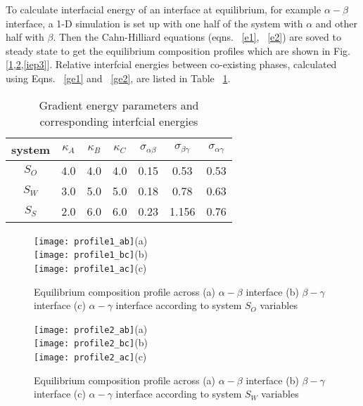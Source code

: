 \documentclass[12pt]{iiscthes}
\theoremstyle{definition}
\theoremstyle{definition}
\theoremstyle{remark}
\begin{document}
To calculate interfacial energy of an interface at equilibrium, for example $\alpha - \beta$ interface, a 1-D simulation is set up with one half of the system with $\alpha$ and other half with $\beta$. Then the Cahn-Hilliard equations (eqns. ~\ref{e1}, ~\ref{e2}) are soved to steady state to get the equilibrium composition profiles which are shown in Fig. [\ref{iep1},\ref{iep2},\ref{iep3}]. Relative interfcial energies between co-existing phases, calculated using Eqns. ~\ref{ge1} and ~\ref{ge2}, are listed in Table ~\ref{geie}.
\begin{table}[h]
\begin{center}
\begin{tabular}{|c|c|c|c|c|c|c|}
\hline
system & $\kappa_A$ & $\kappa_B$ & $\kappa_C$ & $\sigma_{\alpha\beta}$ & $\sigma_{\beta\gamma}$ &$\sigma_{\alpha\gamma}$\\
\hline
$S_O$ & 4.0 &4.0 & 4.0 & 0.15 & 0.53 & 0.53 \\
\hline
$S_W$ & 3.0 &5.0 & 5.0 & 0.18 & 0.78 & 0.63 \\
\hline
$S_S$ & 2.0 &6.0 & 6.0 & 0.23 & 1.156  & 0.76  \\
\hline
\end{tabular}\caption{Gradient energy parameters and corresponding interfcial energies}\label{geie}
\end{center}
\end{table}
\newpage
\begin{figure}[H]
\begin{center}
\texttt{[image: profile1\_ab]}(a)\\
\texttt{[image: profile1\_bc]}(b)\\
\texttt{[image: profile1\_ac]}(c)\\
\caption{Equilibrium composition profile across (a) $\alpha - \beta$ interface (b) $\beta - \gamma$ interface (c) $\alpha - \gamma$ interface according to system $S_O$ variables}\label{iep1}
\end{center}
\end{figure}
\begin{figure}[H]
\begin{center}
\texttt{[image: profile2\_ab]}(a)\\
\texttt{[image: profile2\_bc]}(b)\\
\texttt{[image: profile2\_ac]}(c)\\
\caption{Equilibrium composition profile across (a) $\alpha - \beta$ interface (b) $\beta - \gamma$ interface (c) $\alpha - \gamma$ interface according to system $S_W$ variables}\label{iep2}
\end{center}
\end{figure}
\end{document}
